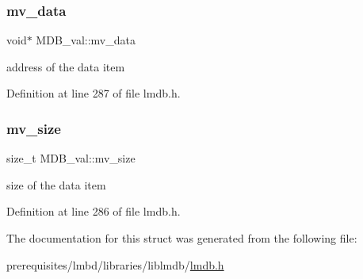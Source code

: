 \subsubsection{\texorpdfstring{mv\+\_\+data}{mv\_data}}
{\footnotesize\ttfamily void$\ast$ M\+D\+B\+\_\+val\+::mv\+\_\+data}

address of the data item 

Definition at line 287 of file lmdb.\+h.

\mbox{\label{struct_m_d_b__val_a9e788910dc056d0cff8915672084dabe}} 
\subsubsection{\texorpdfstring{mv\+\_\+size}{mv\_size}}
{\footnotesize\ttfamily size\+\_\+t M\+D\+B\+\_\+val\+::mv\+\_\+size}

size of the data item 

Definition at line 286 of file lmdb.\+h.



The documentation for this struct was generated from the following file\+:\begin{DoxyCompactItemize}
\item 
prerequisites/lmbd/libraries/liblmdb/\mbox{\hyperlink{lmdb_8h}{lmdb.\+h}}\end{DoxyCompactItemize}
